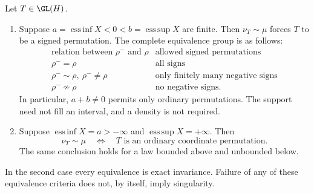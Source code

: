 \begin{theorem}
\label{thm:bounded-and-half-line-classification}
Let \(T\in\GL(H)\).
\begin{enumerate}
 \item Suppose \(a=\operatorname{ess\,inf}X<0<
 b=\operatorname{ess\,sup}X\) are finite.
 Then \(\nu_T\sim\mu\) forces \(T\) to be a signed permutation.
 The complete equivalence group is as follows:
 \[
 \begin{array}{c|l}
 \text{relation between }\rho^-\text{ and }\rho&\text{allowed signed permutations}\\ \hline
 \rho^-=\rho&\text{all signs}\\
 \rho^-\sim\rho,\ \rho^-\ne\rho&
                  \text{only finitely many negative signs}\\
 \rho^-\not\sim\rho&\text{no negative signs}.
 \end{array}
 \]
 In particular, \(a+b\ne0\) permits only ordinary permutations.
 The support need not fill an interval, and a density is not required.
 \item Suppose \(\operatorname{ess\,inf}X=a>-\infty\) and
 \(\operatorname{ess\,sup}X=+\infty\).
 Then
 \begin{equation}
  \nu_T\sim\mu
   \quad\Longleftrightarrow\quad
  T\text{ is an ordinary coordinate permutation}.
  \label{eq:half-line-equivalence-classification}
 \end{equation}
 The same conclusion holds for a law bounded above and unbounded below.
\end{enumerate}
In the second case every equivalence is exact invariance.
Failure of any of these equivalence criteria does not, by itself,
imply singularity.
\end{theorem}
